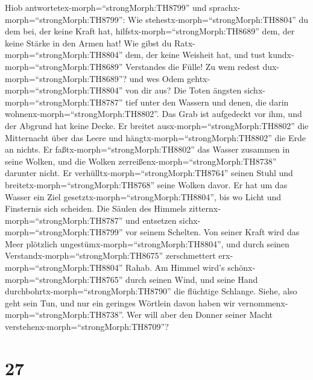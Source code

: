  Hiob antwortetex-morph=``strongMorph:TH8799'' und
sprachx-morph=``strongMorph:TH8799'':  Wie
stehestx-morph=``strongMorph:TH8804'' du dem bei, der keine Kraft hat,
hilfstx-morph=``strongMorph:TH8689'' dem, der keine Stärke in den Armen
hat!  Wie gibst du Ratx-morph=``strongMorph:TH8804'' dem,
der keine Weisheit hat, und tust kundx-morph=``strongMorph:TH8689''
Verstandes die Fülle!  Zu wem redest
dux-morph=``strongMorph:TH8689''? und wes Odem
gehtx-morph=``strongMorph:TH8804'' von dir aus?  Die Toten
ängsten sichx-morph=``strongMorph:TH8787'' tief unter den Wassern und
denen, die darin wohnenx-morph=``strongMorph:TH8802''.  Das
Grab ist aufgedeckt vor ihm, und der Abgrund hat keine Decke.
 Er breitet ausx-morph=``strongMorph:TH8802'' die
Mitternacht über das Leere und hängtx-morph=``strongMorph:TH8802'' die
Erde an nichts.  Er faßtx-morph=``strongMorph:TH8802'' das
Wasser zusammen in seine Wolken, und die Wolken
zerreißenx-morph=``strongMorph:TH8738'' darunter nicht.  Er
verhülltx-morph=``strongMorph:TH8764'' seinen Stuhl und
breitetx-morph=``strongMorph:TH8768'' seine Wolken davor. 
Er hat um das Wasser ein Ziel gesetztx-morph=``strongMorph:TH8804'', bis
wo Licht und Finsternis sich scheiden.  Die Säulen des
Himmels zitternx-morph=``strongMorph:TH8787'' und entsetzen
sichx-morph=``strongMorph:TH8799'' vor seinem Schelten. 
Von seiner Kraft wird das Meer plötzlich
ungestümx-morph=``strongMorph:TH8804'', und durch seinen
Verstandx-morph=``strongMorph:TH8675'' zerschmettert
erx-morph=``strongMorph:TH8804'' Rahab.  Am Himmel wird's
schönx-morph=``strongMorph:TH8765'' durch seinen Wind, und seine Hand
durchbohrtx-morph=``strongMorph:TH8790'' die flüchtige Schlange.
 Siehe, also geht sein Tun, und nur ein geringes Wörtlein
davon haben wir vernommenx-morph=``strongMorph:TH8738''. Wer will aber
den Donner seiner Macht verstehenx-morph=``strongMorph:TH8709''?

\hypertarget{section-26}{%
\section{27}\label{section-26}}

